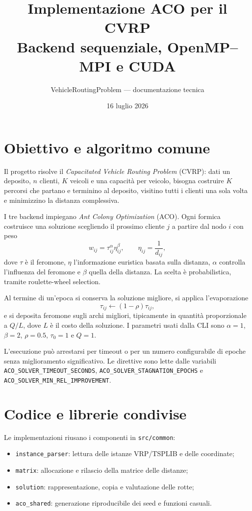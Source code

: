 \documentclass[11pt,a4paper]{article}
\title{\textbf{Implementazione ACO per il CVRP}\\
\large Backend sequenziale, OpenMP--MPI e CUDA}
\author{VehicleRoutingProblem --- documentazione tecnica}
\date{16 luglio 2026}
\begin{document}
\maketitle
\tableofcontents
\newpage

\section{Obiettivo e algoritmo comune}

Il progetto risolve il \emph{Capacitated Vehicle Routing Problem} (CVRP): dati un
deposito, $n$ clienti, $K$ veicoli e una capacità per veicolo, bisogna costruire
$K$ percorsi che partano e terminino al deposito, visitino tutti i clienti una
sola volta e minimizzino la distanza complessiva.

I tre backend impiegano \emph{Ant Colony Optimization} (ACO). Ogni formica
costruisce una soluzione scegliendo il prossimo cliente $j$ a partire dal nodo
$i$ con peso
\[
  w_{ij}=\tau_{ij}^{\alpha}\eta_{ij}^{\beta},
  \qquad \eta_{ij}=\frac{1}{d_{ij}},
\]
dove $\tau$ è il feromone, $\eta$ l'informazione euristica basata sulla distanza,
$\alpha$ controlla l'influenza del feromone e $\beta$ quella della distanza.
La scelta è probabilistica, tramite roulette-wheel selection.

Al termine di un'epoca si conserva la soluzione migliore, si applica
l'evaporazione
\[
  \tau_{ij}\leftarrow(1-\rho)\tau_{ij},
\]
e si deposita feromone sugli archi migliori, tipicamente in quantità
proporzionale a $Q/L$, dove $L$ è il costo della soluzione. I parametri usati
dalla CLI sono $\alpha=1$, $\beta=2$, $\rho=0.5$, $\tau_0=1$ e $Q=1$.

L'esecuzione può arrestarsi per timeout o per un numero configurabile di epoche
senza miglioramento significativo. Le direttive sono lette dalle variabili
\texttt{ACO\_SOLVER\_TIMEOUT\_SECONDS},
\texttt{ACO\_SOLVER\_STAGNATION\_EPOCHS} e
\texttt{ACO\_SOLVER\_MIN\_REL\_IMPROVEMENT}.

\section{Codice e librerie condivise}

Le implementazioni riusano i componenti in \texttt{src/common}:
\begin{itemize}
  \item \texttt{instance\_parser}: lettura delle istanze VRP/TSPLIB e delle coordinate;
  \item \texttt{matrix}: allocazione e rilascio della matrice delle distanze;
  \item \texttt{solution}: rappresentazione, copia e valutazione delle rotte;
  \item \texttt{aco\_shared}: generazione riproducibile dei seed e funzioni casuali.
\end{itemize}
\end{document}
